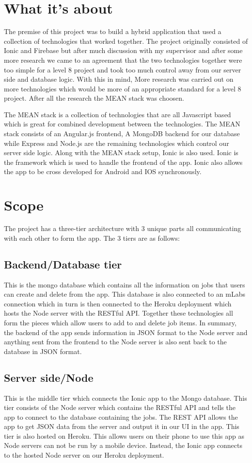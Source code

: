 \section {What it’s about}
The premise of this project was to build a hybrid application that used a collection of technologies that worked together. The project originally consisted of Ionic and Firebase but after much discussion with my supervisor and after some more research we came to an agreement that the two technologies together were too simple for a level 8 project and took too much control away from our server side and database logic. With this in mind, More research was carried out on more technologies which would be more of an appropriate standard for a level 8 project. After all the research  the MEAN stack\cite{Mean-Stack} was choosen.

The MEAN stack is a collection of technologies that are all Javascript based which is great for combined development between the technologies. The MEAN stack consists of an Angular.js frontend, A MongoDB backend for our database while Express and Node.js are the remaining technologies which control our server side logic. Along with the MEAN stack setup, Ionic is also used. Ionic is the framework which is used to handle the frontend of the app. Ionic also allows the app to be cross developed for Android and IOS synchronously.

\section{Scope}
The project has a three-tier architecture with 3 unique parts all communicating with each other to form the app. The 3 tiers are as follows:
\subsection{Backend/Database tier}
This is the mongo database which contains all the information on jobs that users can create and delete from the app. This database is also connected to an mLabs connection which in turn is then connected to the Heroku deployment which hosts the Node server with the RESTful API. Together these technologies all form the pieces which allow users to add to and delete job items. In summary, the backend of the app sends information in JSON format to the Node server and anything sent from the frontend to the Node server is also sent back to the database in JSON format.

\subsection{Server side/Node}
This is the middle tier which connects the Ionic app to the Mongo database.  This tier consists of the Node server which contains the RESTful API and tells the app to connect to the database containing the jobs. The REST API allows the app to get JSON data from the server and output it in our UI in the app. This tier is also hosted on Heroku. This allows users on their phone to use this app as Node servers can not be run by a mobile device. Instead, the Ionic app connects to the hosted Node server on our Heroku deployment. 

